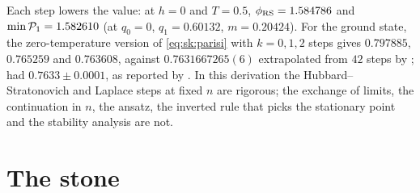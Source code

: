 \begin{refsection}
Each step lowers the value: at $h=0$ and $T=0.5$, $\phi_{\mathrm{RS}}=1.584786$ and $\min\mathcal{P}_1=1.582610$ (at $q_0=0$, $q_1=0.60132$, $m=0.20424$). For the ground state, the zero-temperature version of \eqref{eq:sk:parisi} \parencite{AuffingerChen2017} with $k=0,1,2$ steps gives $0.797885$, $0.765259$ and $0.763608$, against $0.7631667265(6)$ extrapolated from $42$ steps by \textcite{OppermannSchmidtSherrington2007}; \textcite{Parisi1980b} had $0.7633\pm0.0001$, as reported by \textcite{CrisantiRizzo2002}. In this derivation the Hubbard--Stratonovich and Laplace steps at fixed $n$ are rigorous; the exchange of limits, the continuation in $n$, the ansatz, the inverted rule that picks the stationary point and the stability analysis are not.

\section{The stone}\label{sec:sk:stone}


\end{refsection}
